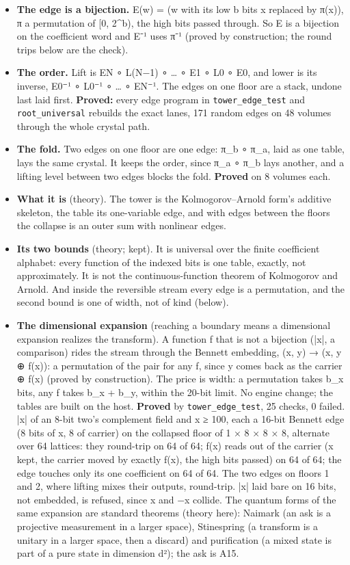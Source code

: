 \begin{itemize}
\item \textbf{The edge is a bijection.} E(w) = (w with its low b bits x replaced by π(x)), π a permutation of [0, 2\textasciicircum{}b), the high bits passed through. So E is a bijection on the coefficient word and E⁻¹ uses π⁻¹ (proved by construction; the round trips below are the check).
\item \textbf{The order.} Lift is EN ∘ L(N−1) ∘ … ∘ E1 ∘ L0 ∘ E0, and lower is its inverse, E0⁻¹ ∘ L0⁻¹ ∘ … ∘ EN⁻¹. The edges on one floor are a stack, undone last laid first. \textbf{Proved:} every edge program in \texttt{tower\_\allowbreak{}edge\_\allowbreak{}test} and \texttt{root\_\allowbreak{}universal} rebuilds the exact lanes, 171 random edges on 48 volumes through the whole crystal path.
\item \textbf{The fold.} Two edges on one floor are one edge: π\_\allowbreak{}b ∘ π\_\allowbreak{}a, laid as one table, lays the same crystal. It keeps the order, since π\_\allowbreak{}a ∘ π\_\allowbreak{}b lays another, and a lifting level between two edges blocks the fold. \textbf{Proved} on 8 volumes each.
\item \textbf{What it is} (theory). The tower is the Kolmogorov–Arnold form's additive skeleton, the table its one-variable edge, and with edges between the floors the collapse is an outer sum with nonlinear edges.
\item \textbf{Its two bounds} (theory; kept). It is universal over the finite coefficient alphabet: every function of the indexed bits is one table, exactly, not approximately. It is not the continuous-function theorem of Kolmogorov and Arnold. And inside the reversible stream every edge is a permutation, and the second bound is one of width, not of kind (below).
\item \textbf{The dimensional expansion} (reaching a boundary means a dimensional expansion realizes the transform). A function f that is not a bijection (|x|, a comparison) rides the stream through the Bennett embedding, (x, y) → (x, y ⊕ f(x)): a permutation of the pair for any f, since y comes back as the carrier ⊕ f(x) (proved by construction). The price is width: a permutation takes b\_\allowbreak{}x bits, any f takes b\_\allowbreak{}x + b\_\allowbreak{}y, within the 20-bit limit. No engine change; the tables are built on the host. \textbf{Proved} by \texttt{tower\_\allowbreak{}edge\_\allowbreak{}test}, 25 checks, 0 failed. |x| of an 8-bit two's complement field and x ≥ 100, each a 16-bit Bennett edge (8 bits of x, 8 of carrier) on the collapsed floor of 1 × 8 × 8 × 8, alternate over 64 lattices: they round-trip on 64 of 64; f(x) reads out of the carrier (x kept, the carrier moved by exactly f(x), the high bits passed) on 64 of 64; the edge touches only its one coefficient on 64 of 64. The two edges on floors 1 and 2, where lifting mixes their outputs, round-trip. |x| laid bare on 16 bits, not embedded, is refused, since x and −x collide. The quantum forms of the same expansion are standard theorems (theory here): Naimark (an ask is a projective measurement in a larger space), Stinespring (a transform is a unitary in a larger space, then a discard) and purification (a mixed state is part of a pure state in dimension d²); the ask is A15.

\end{itemize}
